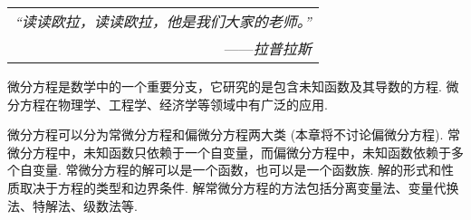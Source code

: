 \begin{flushright}
    \begin{tabular}{r|}
        \textit{“读读欧拉，读读欧拉，他是我们大家的老师。”}\\
        ——\textit{拉普拉斯}
    \end{tabular}
\end{flushright}

微分方程是数学中的一个重要分支，它研究的是包含未知函数及其导数的方程. 微分方程在物理学、工程学、经济学等领域中有广泛的应用. 

微分方程可以分为常微分方程和偏微分方程两大类 (本章将不讨论偏微分方程). 常微分方程中，未知函数只依赖于一个自变量，而偏微分方程中，未知函数依赖于多个自变量. 
常微分方程的解可以是一个函数，也可以是一个函数族. 解的形式和性质取决于方程的类型和边界条件. 解常微分方程的方法包括分离变量法、变量代换法、特解法、级数法等. 